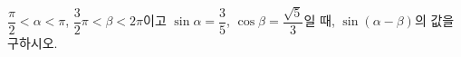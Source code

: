 $\dfrac{\pi}{2}<\alpha<\pi$, $\dfrac{3}{2}\pi<\beta<2\pi$이고 $\sin\alpha=\dfrac{3}{5}$, $\cos\beta=\dfrac{\sqrt{5}}{3}$일 때, $\sin(\alpha-\beta)$의 값을 구하시오.

